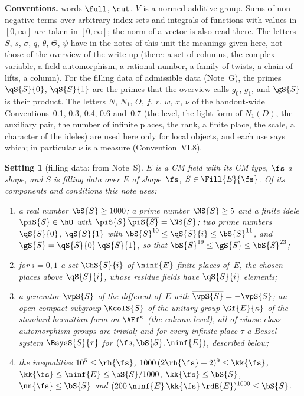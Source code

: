 \documentclass[11pt,a4paper]{article}
\newcommand{\m}[1]{\mbox{$#1$}}        %
\theoremstyle{plainx}
\theoremstyle{uprightx}
\newtheorem{setting}[theorem]{Setting}          %
\newenvironment{conventions}{\par\addvspace{5pt}\noindent\textbf{Conventions.}\enspace\ignorespaces}{\par\addvspace{3pt}}
\renewcommand{\m}[1]{$#1$}
\newcommand{\sk}{\kk{\fs}}
\newcommand{\sn}{\nn{\fs}}
\newcommand{\sro}{\rh{\fs}}
\newcommand{\fE}{\ninf{E}}
\newcommand{\bb}{\bS{S}}
\newcommand{\Nn}{\NS{S}}
\newcommand{\gq}{\gS{S}}
\newcommand{\cj}[1]{\overline{#1}}
\begin{document}
\begin{conventions}
words \m{\full}, \m{\cut}. $V$ is a normed additive group. Sums of non-negative terms over arbitrary index sets and
integrals of functions with values in \m{[0,\infty]} are taken in \m{[0,\infty]}; the norm of a vector is also
read there. The letters $S$, $s$, $\sigma$, $q$, $\theta$, $\Theta$, $\psi$ have in the notes of this unit the
meanings given here, not those of the overview of the write-up (there: a set of columns, the complex variable, a
field automorphism, a rational number, a family of twists, a chain of lifts, a column). For the filling data of
admissible data (Note~G), the primes \m{\qS{S}{0}}, \m{\qS{S}{1}} are the primes that the overview calls $g_0$,
$g_1$, and \m{\gS{S}} is their product. The letters $N$, $N_1$, $O$, $f$, $r$, $w$, $x$, $\nu$ of the handout-wide Conventions~0.1, 0.3, 0.4, 0.6
and~0.7 (the level, the light form of $N_1(D)$, the auxiliary pair, the number of infinite places, the rank, a finite place, the scale, a
character of the ideles) are used here only for local objects, and each use says which; in particular $\nu$ is a measure (Convention~VI.8).
\end{conventions}

\begin{setting}[filling data; from Note~S]\label{set:S}
$E$ is a CM field with its CM type, $\fs$ a shape, and $S$ is filling data over $E$ of shape~$\fs$,
\m{S\in\Fill{E}{\fs}}. Of its components and conditions this note uses:
\begin{enumerate}[label=\textup{(\roman*)},leftmargin=2.3em,itemsep=2pt]
\item a real number \m{\bb\ge1000}; a prime number \m{\Nn\ge5} and a finite idele \m{\piS{S}\in\hO} with
\m{\piS{S}\,\cj{\piS{S}}=\Nn}; two prime numbers \m{\qS{S}{0}}, \m{\qS{S}{1}} with
\m{\bb^{10}\le\qS{S}{i}\le\bb^{11}}, and \m{\gq=\qS{S}{0}\,\qS{S}{1}}, so that \m{\bb^{19}\le\gq\le\bb^{23}};
\item for \m{i=0,1} a set \m{\ChS{S}{i}} of \m{\fE} finite places of~$E$, the \emph{chosen places} above
\m{\qS{S}{i}}, whose residue fields have \m{\qS{S}{i}} elements;
\item a generator \m{\vpS{S}} of the different of~$E$ with \m{\cj{\vpS{S}}=-\vpS{S}}; an open compact subgroup
\m{\KcolS{S}} of the unitary group \m{\Gf{E}{\kappa}} of the standard hermitian form on \m{\AEf^\kappa} (the
\emph{column level}), all of whose class automorphism groups are trivial; and for every infinite place $\tau$ a
Bessel system \m{\BsysS{S}{\tau}} for \m{(\fs,\bb,\fE)}, described below;
\item the inequalities \m{10^5\le\sro}, \m{1000\,(2\sro+2)^9\le\sk}, \m{\sk\le\fE\le\bb/1000}, \m{\sk\le\bb},
\m{\sn\le\bb} and \m{(200\,\fE\,\sk\,\rdE{E})^{1000}\le\bb}.
\end{enumerate}
\end{setting}
\end{document}
